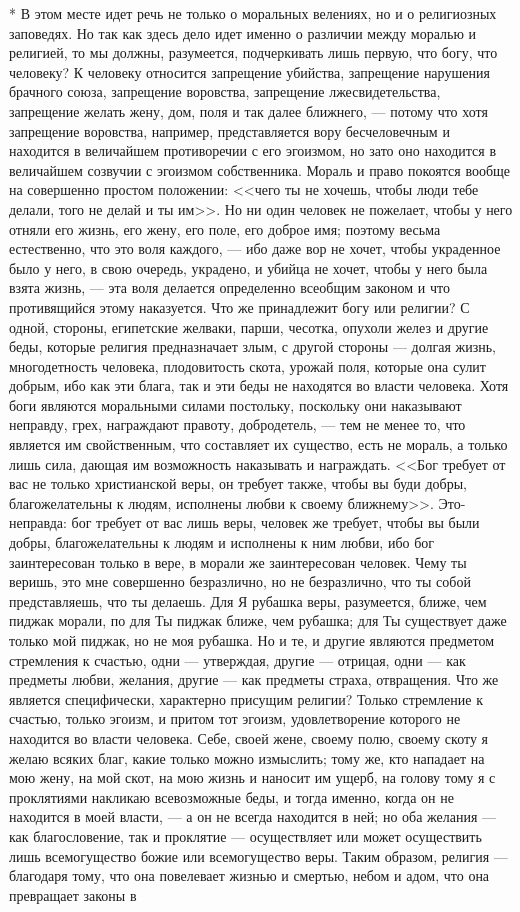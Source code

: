 \documentclass[12pt]{article}
\begin{document}
* В этом месте идет речь не только о моральных велениях, но и о религиозных заповедях. Но так как здесь дело идет именно о различии между моралью и религией, то мы должны, разумеется, подчеркивать лишь первую, что богу, что человеку? К человеку относится запрещение убийства, запрещение нарушения брачного союза, запрещение воровства, запрещение лжесвидетельства, запрещение желать жену, дом, поля и так далее ближнего, --- потому что хотя запрещение воровства, например, представляется вору бесчеловечным и находится в величайшем противоречии с его эгоизмом, но зато оно находится в величайшем созвучии с эгоизмом собственника. Мораль и право покоятся вообще на совершенно простом положении: <<чего ты не хочешь, чтобы люди тебе делали, того не делай и ты им>>. Но ни один человек не пожелает, чтобы у него отняли его жизнь, его жену, его поле, его доброе имя; поэтому весьма естественно, что это воля каждого, --- ибо даже вор не хочет, чтобы украденное было у него, в свою очередь, украдено, и убийца не хочет, чтобы у него была взята жизнь, --- эта воля делается определенно всеобщим законом и что противящийся этому наказуется. Что же принадлежит богу или религии? С одной, стороны, египетские желваки, парши, чесотка, опухоли желез и другие беды, которые религия предназначает злым, с другой стороны --- долгая жизнь, многодетность человека, плодовитость скота, урожай поля, которые она сулит добрым, ибо как эти блага, так и эти беды не находятся во власти человека. Хотя боги являются моральными силами постольку, поскольку они наказывают неправду, грех, награждают правоту, добродетель, --- тем не менее то, что является им свойственным, что составляет их существо, есть не мораль, а только лишь сила, дающая им возможность наказывать и награждать. <<Бог требует от вас не только христианской веры, он требует также, чтобы вы буди добры, благожелательны к людям, исполнены любви к своему ближнему>>. Это-неправда: бог требует от вас лишь веры, человек же требует, чтобы вы были добры, благожелательны к людям и исполнены к ним любви, ибо бог заинтересован только в вере, в морали же заинтересован человек. Чему ты веришь, это мне совершенно безразлично, но не безразлично, что ты собой представляешь, что ты делаешь. Для Я рубашка веры, разумеется, ближе, чем пиджак морали, по для Ты пиджак ближе, чем рубашка; для Ты существует даже только мой пиджак, но не моя рубашка. Но и те, и другие являются предметом стремления к счастью, одни --- утверждая, другие --- отрицая, одни --- как предметы любви, желания, другие --- как предметы страха, отвращения. Что же является специфически, характерно присущим религии? Только стремление к счастью, только эгоизм, и притом тот эгоизм, удовлетворение которого не находится во власти человека. Себе, своей жене, своему полю, своему скоту я желаю всяких благ, какие только можно измыслить; тому же, кто нападает на мою жену, на мой скот, на мою жизнь и наносит им ущерб, на голову тому я с проклятиями накликаю всевозможные беды, и тогда именно, когда он не находится в моей власти, --- а он не всегда находится в ней; но оба желания --- как благословение, так и проклятие --- осуществляет или может осуществить лишь всемогущество божие или всемогущество веры. Таким образом, религия --- благодаря тому, что она повелевает жизнью и смертью, небом и адом, что она превращает законы в 
\end{document}
